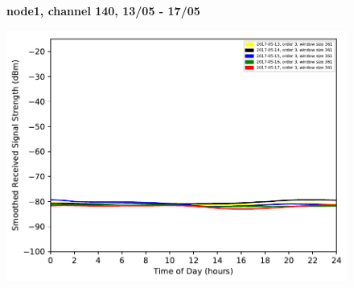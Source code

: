 \begin{figure}[h!]
    \centering
    \textbf{node1, channel 140, 13/05 - 17/05}\par\medskip
	\includegraphics[scale=0.4]{images/5_GHz/node1_2017-05-17_chan140_image.pdf}
\end{figure}\\
